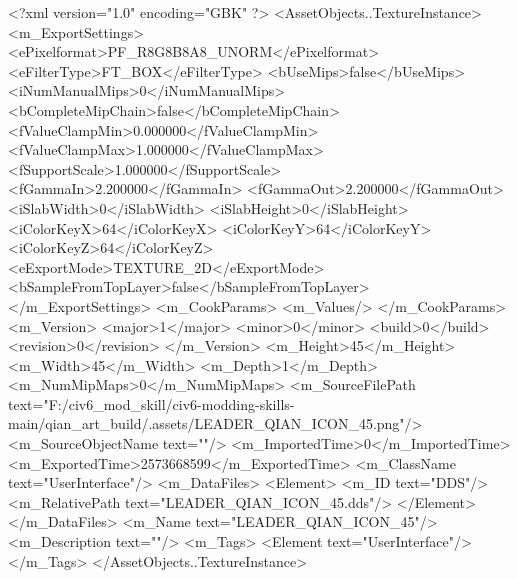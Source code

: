 <?xml version="1.0" encoding="GBK" ?>
<AssetObjects..TextureInstance>
	<m_ExportSettings>
		<ePixelformat>PF_R8G8B8A8_UNORM</ePixelformat>
		<eFilterType>FT_BOX</eFilterType>
		<bUseMips>false</bUseMips>
		<iNumManualMips>0</iNumManualMips>
		<bCompleteMipChain>false</bCompleteMipChain>
		<fValueClampMin>0.000000</fValueClampMin>
		<fValueClampMax>1.000000</fValueClampMax>
		<fSupportScale>1.000000</fSupportScale>
		<fGammaIn>2.200000</fGammaIn>
		<fGammaOut>2.200000</fGammaOut>
		<iSlabWidth>0</iSlabWidth>
		<iSlabHeight>0</iSlabHeight>
		<iColorKeyX>64</iColorKeyX>
		<iColorKeyY>64</iColorKeyY>
		<iColorKeyZ>64</iColorKeyZ>
		<eExportMode>TEXTURE_2D</eExportMode>
		<bSampleFromTopLayer>false</bSampleFromTopLayer>
	</m_ExportSettings>
	<m_CookParams>
		<m_Values/>
	</m_CookParams>
	<m_Version>
		<major>1</major>
		<minor>0</minor>
		<build>0</build>
		<revision>0</revision>
	</m_Version>
	<m_Height>45</m_Height>
	<m_Width>45</m_Width>
	<m_Depth>1</m_Depth>
	<m_NumMipMaps>0</m_NumMipMaps>
	<m_SourceFilePath text="F:/civ6_mod_skill/civ6-modding-skills-main/qian_art_build/.assets/LEADER_QIAN_ICON_45.png"/>
	<m_SourceObjectName text=""/>
	<m_ImportedTime>0</m_ImportedTime>
	<m_ExportedTime>2573668599</m_ExportedTime>
	<m_ClassName text="UserInterface"/>
	<m_DataFiles>
		<Element>
			<m_ID text="DDS"/>
			<m_RelativePath text="LEADER_QIAN_ICON_45.dds"/>
		</Element>
	</m_DataFiles>
	<m_Name text="LEADER_QIAN_ICON_45"/>
	<m_Description text=""/>
	<m_Tags>
		<Element text="UserInterface"/>
	</m_Tags>
</AssetObjects..TextureInstance>

